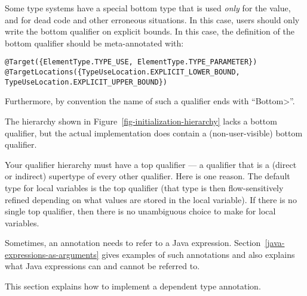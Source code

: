 
Some type systems have a special bottom type that is used \emph{only} for
the  value, and for dead code and other erroneous situations.
In this case, users should only write the bottom qualifier on explicit
bounds.  In this case, the definition of the bottom qualifier should be
meta-annotated with:

%
\begin{Verbatim}
@Target({ElementType.TYPE_USE, ElementType.TYPE_PARAMETER})
@TargetLocations({TypeUseLocation.EXPLICIT_LOWER_BOUND, TypeUseLocation.EXPLICIT_UPPER_BOUND})
\end{Verbatim}

Furthermore, by convention the name of such a qualifier ends with ``\<Bottom>''.

The hierarchy shown in Figure~\ref{fig-initialization-hierarchy} lacks
a bottom qualifier, but the actual implementation does contain a (non-user-visible) bottom qualifier.


Your qualifier hierarchy must have a top qualifier
--- a qualifier that is a (direct or indirect) supertype of every other
qualifier.
Here is one reason.
The default type for local variables is the top
qualifier (that type is then flow-sensitively
refined depending on what values are stored in the local variable).
If there is no single top qualifier, then there is no
unambiguous choice to make for local variables.



Sometimes, an annotation needs to refer to a Java expression.
Section~\ref{java-expressions-as-arguments} gives examples of such
annotations and also explains what Java expressions can and cannot be
referred to.

This section explains how to implement a dependent type annotation.

